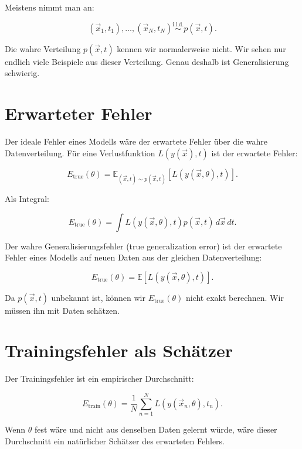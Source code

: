 Meistens nimmt man an:

\[
    (\vec{x}_1,t_1),\dots,(\vec{x}_N,t_N)
    \overset{\mathrm{i.i.d.}}{\sim}
    p(\vec{x},t).
\]

\begin{notebox}
Die wahre Verteilung \(p(\vec{x},t)\) kennen wir normalerweise nicht.
Wir sehen nur endlich viele Beispiele aus dieser Verteilung.
Genau deshalb ist Generalisierung schwierig.
\end{notebox}

\section{Erwarteter Fehler}

Der ideale Fehler eines Modells wäre der erwartete Fehler über die wahre Datenverteilung.
Für eine Verlustfunktion \(L(y(\vec{x}),t)\) ist der erwartete Fehler:

\[
    E_{\mathrm{true}}(\theta)
    =
    \mathbb{E}_{(\vec{x},t)\sim p(\vec{x},t)}
    \left[
        L(y(\vec{x},\theta),t)
    \right].
\]

Als Integral:

\[
    E_{\mathrm{true}}(\theta)
    =
    \int
    L(y(\vec{x},\theta),t)
    p(\vec{x},t)
    \,d\vec{x}\,dt.
\]

\begin{definitionbox}
Der wahre Generalisierungsfehler (true generalization error) ist der erwartete Fehler eines Modells auf neuen Daten aus der gleichen Datenverteilung:

\[
    E_{\mathrm{true}}(\theta)
    =
    \mathbb{E}
    \left[
        L(y(\vec{x},\theta),t)
    \right].
\]
\end{definitionbox}

Da \(p(\vec{x},t)\) unbekannt ist, können wir \(E_{\mathrm{true}}(\theta)\) nicht exakt berechnen.
Wir müssen ihn mit Daten schätzen.

\section{Trainingsfehler als Schätzer}

Der Trainingsfehler ist ein empirischer Durchschnitt:

\[
    E_{\mathrm{train}}(\theta)
    =
    \frac{1}{N}
    \sum_{n=1}^{N}
    L(y(\vec{x}_n,\theta),t_n).
\]

Wenn \(\theta\) fest wäre und nicht aus denselben Daten gelernt würde, wäre dieser Durchschnitt ein natürlicher Schätzer des erwarteten Fehlers.

